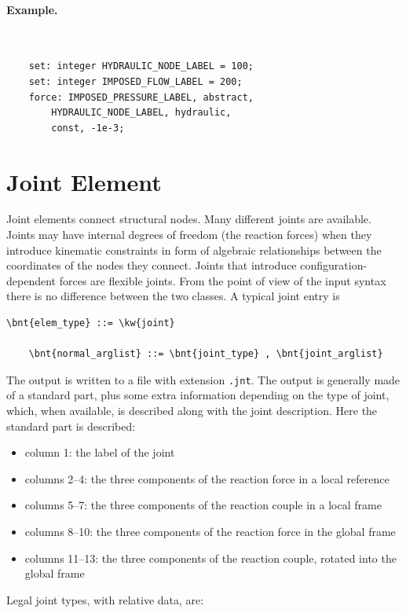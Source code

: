 \paragraph{Example.} \
\begin{verbatim}
    set: integer HYDRAULIC_NODE_LABEL = 100;
    set: integer IMPOSED_FLOW_LABEL = 200;
    force: IMPOSED_PRESSURE_LABEL, abstract,
        HYDRAULIC_NODE_LABEL, hydraulic,
        const, -1e-3;
\end{verbatim}





\section{Joint Element}
\label{sec:EL:JOINT}
Joint elements connect structural nodes.
Many different joints are available. 
Joints may have internal degrees of freedom (the reaction forces)
when they introduce kinematic constraints in form of algebraic relationships
between the coordinates of the nodes they connect.
Joints that introduce configuration-dependent forces are flexible joints.
From the point of view of the input syntax there is no difference between
the two classes.
A typical joint entry is
\begin{Verbatim}[commandchars=\\\{\}]
    \bnt{elem_type} ::= \kw{joint}

    \bnt{normal_arglist} ::= \bnt{joint_type} , \bnt{joint_arglist}
\end{Verbatim}
The output is written to a file with extension \texttt{.jnt}.
The output is generally made of a standard part, plus some extra information
depending on the type of joint, which, when available, is described along
with the joint description.
Here the standard part is described:
\begin{itemize}
    \item column 1: the label of the joint
    \item columns 2--4: the three components of the reaction force in a local reference
    \item columns 5--7: the three components of the reaction couple in a local frame
    \item columns 8--10: the three components of the reaction force in the global frame
    \item columns 11--13: the three components of the reaction couple, rotated into the
          global frame
\end{itemize}
Legal joint types, with relative data, are:




